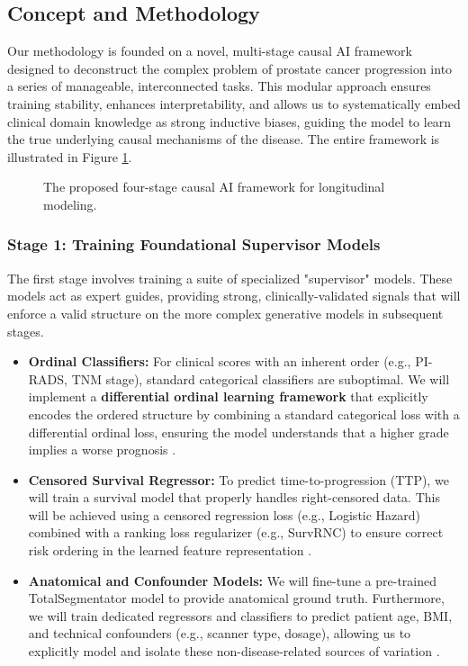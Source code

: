 \documentclass[11pt, a4paper]{article}
\begin{document}
\subsection{Concept and Methodology}
Our methodology is founded on a novel, multi-stage causal AI framework designed to deconstruct the complex problem of prostate cancer progression into a series of manageable, interconnected tasks. This modular approach ensures training stability, enhances interpretability, and allows us to systematically embed clinical domain knowledge as strong inductive biases, guiding the model to learn the true underlying causal mechanisms of the disease. The entire framework is illustrated in Figure \ref{fig:ml_framework}.

\begin{figure}[H]
    \centering
    \caption{The proposed four-stage causal AI framework for longitudinal modeling.}
    \label{fig:ml_framework}
\end{figure}

\subsubsection{Stage 1: Training Foundational Supervisor Models}
The first stage involves training a suite of specialized "supervisor" models. These models act as expert guides, providing strong, clinically-validated signals that will enforce a valid structure on the more complex generative models in subsequent stages.
\begin{itemize}
    \item \textbf{Ordinal Classifiers:} For clinical scores with an inherent order (e.g., PI-RADS, TNM stage), standard categorical classifiers are suboptimal. We will implement a \textbf{differential ordinal learning framework} that explicitly encodes the ordered structure by combining a standard categorical loss with a differential ordinal loss, ensuring the model understands that a higher grade implies a worse prognosis \cite{LeeByeon2025, GrisiKartasalo2025}.
    \item \textbf{Censored Survival Regressor:} To predict time-to-progression (TTP), we will train a survival model that properly handles right-censored data. This will be achieved using a censored regression loss (e.g., Logistic Hazard) combined with a ranking loss regularizer (e.g., SurvRNC) to ensure correct risk ordering in the learned feature representation \cite{GaoLi2019, RivailVogl2023, ShahinZhao2023}.
    \item \textbf{Anatomical and Confounder Models:} We will fine-tune a pre-trained TotalSegmentator model to provide anatomical ground truth. Furthermore, we will train dedicated regressors and classifiers to predict patient age, BMI, and technical confounders (e.g., scanner type, dosage), allowing us to explicitly model and isolate these non-disease-related sources of variation \cite{PuglisiAlexander2025, ZhangHager2025}.
\end{itemize}
\end{document}
